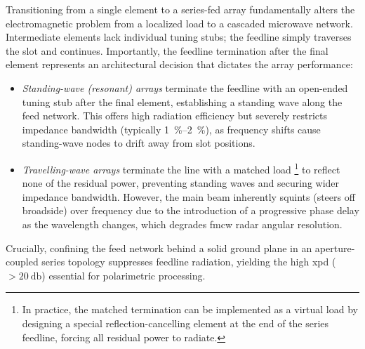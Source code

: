 Transitioning from a single element to a series-fed array fundamentally alters the electromagnetic problem from a localized load to a cascaded microwave network.
Intermediate elements lack individual tuning stubs; the feedline simply traverses the slot and continues.
Importantly, the feedline termination after the final element represents an architectural decision that dictates the array performance:
\begin{itemize}
    \item \emph{Standing-wave (resonant) arrays} terminate the feedline with an open-ended tuning stub after the final element, establishing a standing wave along the feed network.
    This offers high radiation efficiency but severely restricts impedance bandwidth (typically \qtyrange{1}{2}{\percent}), as frequency shifts cause standing-wave nodes to drift away from slot positions.
    \item \emph{Travelling-wave arrays} terminate the line with a matched load%
        \footnote{In practice, the matched termination can be implemented as a virtual load by designing a special reflection-cancelling element at the end of the series feedline, forcing all residual power to radiate.}
    to reflect none of the residual power, preventing standing waves and securing wider impedance bandwidth.
    However, the main beam inherently squints (steers off broadside) over frequency due to the introduction of a progressive phase delay as the wavelength changes, which degrades \gls{fmcw} radar angular resolution.
\end{itemize}
Crucially, confining the feed network behind a solid ground plane in an aperture-coupled series topology suppresses feedline radiation, yielding the high \gls{xpd} ($> \qty{20}{\decibel}$) essential for polarimetric processing.

